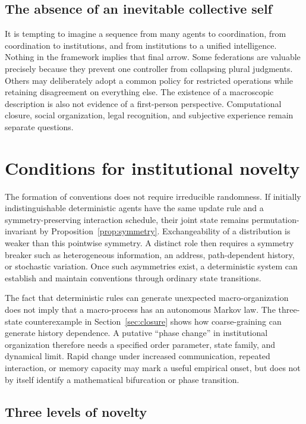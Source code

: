 \documentclass[11pt,letterpaper]{article}
\theoremstyle{plain}
\theoremstyle{definition}
\theoremstyle{remark}
\begin{document}
\subsection{The absence of an inevitable collective self}

It is tempting to imagine a sequence from many agents to coordination, from coordination to institutions, and from institutions to a unified intelligence. Nothing in the framework implies that final arrow. Some federations are valuable precisely because they prevent one controller from collapsing plural judgments. Others may deliberately adopt a common policy for restricted operations while retaining disagreement on everything else. The existence of a macroscopic description is also not evidence of a first-person perspective. Computational closure, social organization, legal recognition, and subjective experience remain separate questions.

\section{Conditions for institutional novelty}\label{sec:novelty}

The formation of conventions does not require irreducible randomness. If initially indistinguishable deterministic agents have the same update rule and a symmetry-preserving interaction schedule, their joint state remains permutation-invariant by Proposition~\ref{prop:symmetry}. Exchangeability of a distribution is weaker than this pointwise symmetry. A distinct role then requires a symmetry breaker such as heterogeneous information, an address, path-dependent history, or stochastic variation. Once such asymmetries exist, a deterministic system can establish and maintain conventions through ordinary state transitions.

The fact that deterministic rules can generate unexpected macro-organization does not imply that a macro-process has an autonomous Markov law. The three-state counterexample in Section~\ref{sec:closure} shows how coarse-graining can generate history dependence. A putative ``phase change'' in institutional organization therefore needs a specified order parameter, state family, and dynamical limit. Rapid change under increased communication, repeated interaction, or memory capacity may mark a useful empirical onset, but does not by itself identify a mathematical bifurcation or phase transition.

\subsection{Three levels of novelty}
\end{document}
